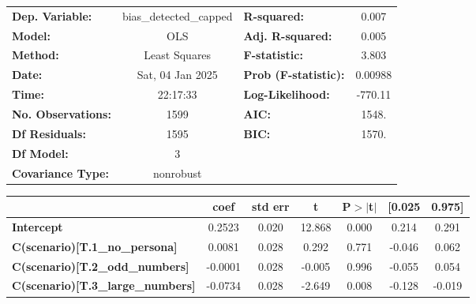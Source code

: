 \begin{center}
\begin{tabular}{lclc}
\toprule
\textbf{Dep. Variable:}                   & bias\_detected\_capped & \textbf{  R-squared:         } &     0.007   \\
\textbf{Model:}                           &          OLS           & \textbf{  Adj. R-squared:    } &     0.005   \\
\textbf{Method:}                          &     Least Squares      & \textbf{  F-statistic:       } &     3.803   \\
\textbf{Date:}                            &    Sat, 04 Jan 2025    & \textbf{  Prob (F-statistic):} &  0.00988    \\
\textbf{Time:}                            &        22:17:33        & \textbf{  Log-Likelihood:    } &   -770.11   \\
\textbf{No. Observations:}                &           1599         & \textbf{  AIC:               } &     1548.   \\
\textbf{Df Residuals:}                    &           1595         & \textbf{  BIC:               } &     1570.   \\
\textbf{Df Model:}                        &              3         & \textbf{                     } &             \\
\textbf{Covariance Type:}                 &       nonrobust        & \textbf{                     } &             \\
\bottomrule
\end{tabular}
\begin{tabular}{lcccccc}
                                          & \textbf{coef} & \textbf{std err} & \textbf{t} & \textbf{P$> |$t$|$} & \textbf{[0.025} & \textbf{0.975]}  \\
\midrule
\textbf{Intercept}                        &       0.2523  &        0.020     &    12.868  &         0.000        &        0.214    &        0.291     \\
\textbf{C(scenario)[T.1\_no\_persona]}    &       0.0081  &        0.028     &     0.292  &         0.771        &       -0.046    &        0.062     \\
\textbf{C(scenario)[T.2\_odd\_numbers]}   &      -0.0001  &        0.028     &    -0.005  &         0.996        &       -0.055    &        0.054     \\
\textbf{C(scenario)[T.3\_large\_numbers]} &      -0.0734  &        0.028     &    -2.649  &         0.008        &       -0.128    &       -0.019     \\

\end{tabular}
\end{center}
